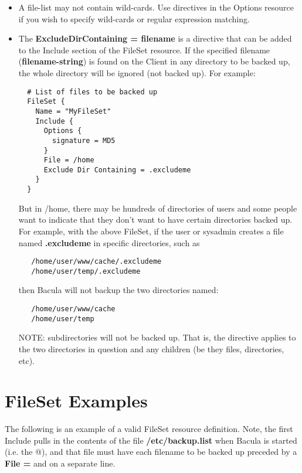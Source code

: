 \begin{itemize}
\item A file-list may not contain wild-cards. Use directives in the
   Options resource if you wish to specify wild-cards or regular expression
   matching.

\item
{}
The {\bf ExcludeDirContaining = \lt{}filename\gt{}} is a directive that
can be added to the Include section of the FileSet resource.  If the specified
filename ({\bf filename-string}) is found on the Client in any directory to be
backed up, the whole directory will be ignored (not backed up).  For example:

\begin{verbatim}
  # List of files to be backed up
  FileSet {
    Name = "MyFileSet"
    Include {
      Options {
        signature = MD5
      }
      File = /home
      Exclude Dir Containing = .excludeme
    }
  }
\end{verbatim}

But in /home, there may be hundreds of directories of users and some
people want to indicate that they don't want to have certain
directories backed up. For example, with the above FileSet, if
the user or sysadmin creates a file named {\bf .excludeme} in 
specific directories, such as

\begin{verbatim}
   /home/user/www/cache/.excludeme
   /home/user/temp/.excludeme
\end{verbatim}

then Bacula will not backup the two directories named:

\begin{verbatim}
   /home/user/www/cache
   /home/user/temp
\end{verbatim}

NOTE: subdirectories will not be backed up.  That is, the directive
applies to the two directories in question and any children (be they
files, directories, etc).

\end{itemize}

\section{FileSet Examples}

The following is an example of a valid FileSet resource definition.  Note,
the first Include pulls in the contents of the file {\bf /etc/backup.list}
when Bacula is started (i.e.  the @), and that file must have each filename
to be backed up preceded by a {\bf File =} and on a separate line.

